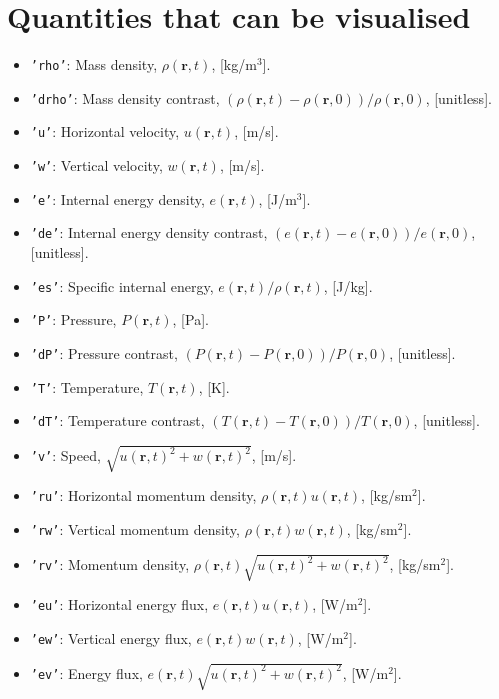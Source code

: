 \documentclass{article}
\newcommand{\ttt}[1]{\texttt{#1}}
\begin{document}
\section{Quantities that can be visualised}
\label{sec:quants}
\begin{itemize}
	\item \ttt{'rho'}: Mass density, $\rho(\mathbf{r}, t)$, [kg/m$^3$].
	\item \ttt{'drho'}: Mass density contrast, $(\rho(\mathbf{r}, t) - \rho(\mathbf{r}, 0))/\rho(\mathbf{r}, 0)$, [unitless].
	\item \ttt{'u'}: Horizontal velocity, $u(\mathbf{r}, t)$, [m/s].
	\item \ttt{'w'}: Vertical velocity, $w(\mathbf{r}, t)$, [m/s].
	\item \ttt{'e'}: Internal energy density, $e(\mathbf{r}, t)$, [J/m$^3$].
	\item \ttt{'de'}: Internal energy density contrast, $(e(\mathbf{r}, t) - e(\mathbf{r}, 0))/e(\mathbf{r}, 0)$, [unitless].
	\item \ttt{'es'}: Specific internal energy, $e(\mathbf{r}, t)/\rho(\mathbf{r}, t)$, [J/kg].
	\item \ttt{'P'}: Pressure, $P(\mathbf{r}, t)$, [Pa].
	\item \ttt{'dP'}: Pressure contrast, $(P(\mathbf{r}, t) - P(\mathbf{r}, 0))/P(\mathbf{r}, 0)$, [unitless].
	\item \ttt{'T'}: Temperature, $T(\mathbf{r}, t)$, [K].
	\item \ttt{'dT'}: Temperature contrast, $(T(\mathbf{r}, t) - T(\mathbf{r}, 0))/T(\mathbf{r}, 0)$, [unitless].
	\item \ttt{'v'}: Speed, $\sqrt{u(\mathbf{r}, t)^2 + w(\mathbf{r}, t)^2}$, [m/s].
	\item \ttt{'ru'}: Horizontal momentum density, $\rho(\mathbf{r}, t)u(\mathbf{r}, t)$, [kg/sm$^2$].
	\item \ttt{'rw'}: Vertical momentum density, $\rho(\mathbf{r}, t)w(\mathbf{r}, t)$, [kg/sm$^2$].
	\item \ttt{'rv'}: Momentum density, $\rho(\mathbf{r}, t)\sqrt{u(\mathbf{r}, t)^2 + w(\mathbf{r}, t)^2}$, [kg/sm$^2$].
	\item \ttt{'eu'}: Horizontal energy flux, $e(\mathbf{r}, t)u(\mathbf{r}, t)$, [W/m$^2$].
	\item \ttt{'ew'}: Vertical energy flux, $e(\mathbf{r}, t)w(\mathbf{r}, t)$, [W/m$^2$].
	\item \ttt{'ev'}: Energy flux, $e(\mathbf{r}, t)\sqrt{u(\mathbf{r}, t)^2 + w(\mathbf{r}, t)^2}$, [W/m$^2$].
\end{itemize}
\end{document}
